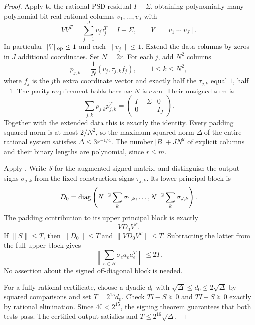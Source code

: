 \begin{proof}
Apply  to the rational PSD residual
$I-\Sigma$, obtaining polynomially many polynomial-bit real rational
columns $v_1,\ldots,v_J$ with
\begin{equation}
                      VV^T=\sum_{j=1}^Jv_jv_j^T=I-\Sigma,
                         \qquad V=[v_1\ \cdots\ v_J].
 \label{eq:ta-padding-factor}
\end{equation}
In particular $\|V\|_{\mathrm{op}}\le1$ and each $\|v_j\|\le1$.
Extend the data columns by zeros in $J$ additional coordinates. Set
$N=2r$. For each $j$, add $N^2$ columns
\begin{equation}
                 p_{j,k}=\frac1N(v_j,\tau_{j,k}f_j),
       \qquad 1\le k\le N^2,
 \label{eq:ta-padding-columns}
\end{equation}
where $f_j$ is the $j$th extra coordinate vector and exactly half the
$\tau_{j,k}$ equal $1$, half $-1$. The parity requirement holds because
$N$ is even. Their unsigned sum is
\[
 \sum_{j,k}p_{j,k}p_{j,k}^T
       =\begin{pmatrix}I-\Sigma&0\\0&I_J\end{pmatrix}.
\]
Together with the extended data this is exactly the identity.
Every padding squared norm is at most $2/N^2$, so the maximum squared
norm $\Delta$ of the entire rational system satisfies
$\Delta\le3r^{-1/4}$. The number $|B|+JN^2$ of explicit columns and
their binary lengths are polynomial, since $r\le m$.

Apply . Write $S$ for the augmented signed
matrix, and distinguish the output signs $\sigma_{j,k}$ from the fixed
construction signs $\tau_{j,k}$. Its lower principal block is
\[
 D_0=\operatorname{diag}\left(N^{-2}\sum_k\sigma_{1,k},\ldots,
                         N^{-2}\sum_k\sigma_{J,k}\right).
\]
The padding contribution to its upper principal block is exactly
\begin{equation}
                              VD_0V^T.
 \label{eq:ta-padding-removal}
\end{equation}
If $\|S\|\le T$, then $\|D_0\|\le T$ and
$\|VD_0V^T\|\le T$. Subtracting the latter from the full upper block
gives
\begin{equation}
                    \left\|\sum_{e\in B}\sigma_ea_ea_e^T\right\|
                                \le2T.
 \label{eq:ta-data-signing}
\end{equation}
No assertion about the signed off-diagonal block is needed.

For a fully rational certificate, choose a dyadic $d_0$ with
$\sqrt\Delta\le d_0\le2\sqrt\Delta$ by squared comparisons and set
$T=2^{15}d_0$. Check $TI-S\succeq0$ and $TI+S\succeq0$ exactly by
rational elimination. Since $40<2^{15}$, the signing theorem guarantees
that both tests pass. The certified output satisfies
 and $T\le2^{16}\sqrt\Delta$.


\end{proof}

